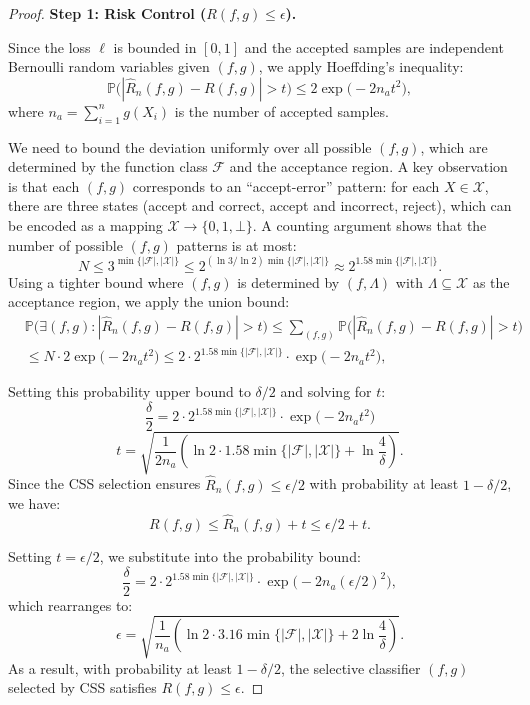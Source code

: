 \documentclass[sigconf,review,anonymous]{acmart}
\theoremstyle{remark}
\begin{document}
\begin{proof}
\textbf{Step 1: Risk Control ($R(f,g) \leq \epsilon$).}


Since the loss $\ell$ is bounded in $[0,1]$ and the accepted samples are independent Bernoulli random variables given $(f,g)$, we apply Hoeffding's inequality:
\[
\mathbb{P}\bigl(|\hat{R}_n(f,g) - R(f,g)| > t\bigr) \leq 2\exp\bigl(-2n_a t^2\bigr),
\]
where $n_a = \sum_{i=1}^n g(X_i)$ is the number of accepted samples.

We need to bound the deviation uniformly over all possible $(f,g)$, which are determined by the function class $\mathcal{F}$ and the acceptance region. A key observation is that each $(f,g)$ corresponds to an ``accept-error'' pattern: for each $X \in \mathcal{X}$, there are three states (accept and correct, accept and incorrect, reject), which can be encoded as a mapping $\mathcal{X} \to \{0,1,\bot\}$.
A counting argument shows that the number of possible $(f,g)$ patterns is at most:
\[
N \leq 3^{\min\{|\mathcal{F}|,|\mathcal{X}|\}} \leq 2^{(\ln 3 / \ln 2) \min\{|\mathcal{F}|,|\mathcal{X}|\}} \approx 2^{1.58 \min\{|\mathcal{F}|,|\mathcal{X}|\}}.
\]
Using a tighter bound where $(f,g)$ is determined by $(f, \Lambda)$ with $\Lambda \subseteq \mathcal{X}$ as the acceptance region, we apply the union bound:
\begin{align*}
    & \mathbb{P}\bigl(\exists (f,g) : |\hat{R}_n(f,g) - R(f,g)| > t\bigr) \leq \sum_{(f,g)} \mathbb{P}\bigl(|\hat{R}_n(f,g) - R(f,g)| > t\bigr) \\
    & \leq N \cdot 2\exp\bigl(-2n_{a} t^2\bigr) \leq 2 \cdot 2^{1.58 \min\{|\mathcal{F}|,|\mathcal{X}|\}} \cdot \exp\bigl(-2n_{a} t^2\bigr),
\end{align*}

Setting this probability upper bound to $\delta/2$ and solving for $t$:
\[
\frac{\delta}{2} = 2 \cdot 2^{1.58\min\{|\mathcal{F}|,|\mathcal{X}|\}} \cdot \exp\bigl(-2n_{a} t^2\bigr)
\]
\[
t = \sqrt{\frac{1}{2n_{a}} \left( \ln 2 \cdot 1.58\min\{|\mathcal{F}|,|\mathcal{X}|\} + \ln \frac{4}{\delta} \right)}.
\]
Since the CSS selection ensures $\hat{R}_n(f,g) \leq \epsilon/2$ with probability at least $1-\delta/2$, we have:
\[
R(f,g) \leq \hat{R}_n(f,g) + t \leq \epsilon/2 + t.
\]


Setting $t = \epsilon/2$, we substitute into the probability bound:
\[
\frac{\delta}{2} = 2 \cdot 2^{1.58\min\{|\mathcal{F}|,|\mathcal{X}|\}} \cdot \exp\bigl(-2n_{a} (\epsilon/2)^2\bigr),
\]
which rearranges to:
\[
\epsilon = \sqrt{\frac{1}{n_{a}} \left( \ln 2 \cdot 3.16\min\{|\mathcal{F}|,|\mathcal{X}|\} + 2\ln \frac{4}{\delta} \right)}.
\]
As a result, with probability at least $1-\delta/2$, the selective classifier $(f,g)$ selected by CSS satisfies $R(f,g) \leq \epsilon$.


\end{proof}
\end{document}
